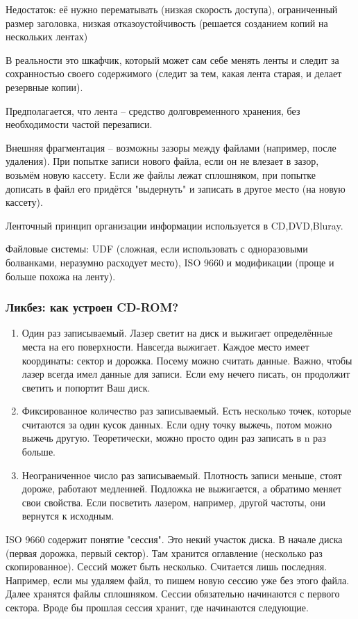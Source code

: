 \documentclass[a4paper,10pt]{article}
\begin{document}
Недостаток: её нужно перематывать (низкая скорость доступа), ограниченный размер заголовка, низкая отказоустойчивость (решается созданием копий на нескольких лентах)

В реальности это шкафчик, который может сам себе менять ленты и следит за сохранностью своего содержимого (следит за тем, какая лента старая, и делает резервные копии).

Предполагается, что лента -- средство долговременного хранения, без необходимости частой перезаписи.

Внешняя фрагментация -- возможны зазоры между файлами (например, после удаления). 
При попытке записи нового файла, если он не влезает в зазор, возьмём новую кассету. 
Если же файлы лежат сплошняком, при попытке дописать в файл его придётся "выдернуть" и записать в другое место (на новую кассету).

Ленточный принцип организации информации используется в CD,DVD,Bluray. 

Файловые системы: UDF (сложная, если использовать с одноразовыми болванками, неразумно расходует место), ISO 9660 и модификации (проще и больше похожа на ленту).

\subsubsection{Ликбез: как устроен CD-ROM?}
\begin{enumerate}
 \item Один раз записываемый. 
 Лазер светит на диск и выжигает определённые места на его поверхности. Навсегда выжигает. Каждое место имеет координаты: сектор и дорожка. Посему можно считать данные.
 Важно, чтобы лазер всегда имел данные для записи. Если ему нечего писать, он продолжит светить и попортит Ваш диск.
 \item Фиксированное количество раз записываемый. Есть несколько точек, которые считаются за один кусок данных. Если одну точку выжечь, потом можно выжечь другую.
 Теоретически, можно просто один раз записать в n раз больше.
 \item Неограниченное число раз записываемый. Плотность записи меньше, стоят дороже, работают медленней.
 Подложка не выжигается, а обратимо меняет свои свойства. Если посветить лазером, например, другой частоты, они вернутся к исходным.
\end{enumerate}

ISO 9660 содержит понятие "сессия". Это некий участок диска. В начале диска (первая дорожка, первый сектор). Там хранится оглавление (несколько раз скопированное). 
Сессий может быть несколько. Считается лишь последняя. Например, если мы удаляем файл, то пишем новую сессию уже без этого файла. Далее хранятся файлы сплошняком.
Сессии обязательно начинаются с первого сектора. Вроде бы прошлая сессия хранит, где начинаются следующие.
\end{document}
